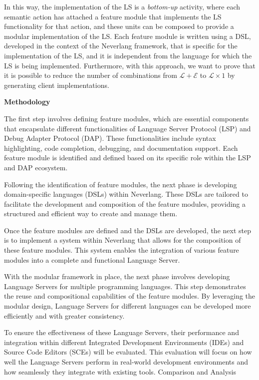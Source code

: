 In this way, the implementation of the LS is a \textit{bottom-up} activity, where each semantic action has attached a feature module that implements the LS functionality for that action, and these units can be composed to provide a modular implementation of the LS.
Each feature module is written using a DSL, developed in the context of the Neverlang framework, that is specific for the implementation of the LS, and it is independent from the language for which the LS is being implemented.
Furthermore, with this approach, we want to prove that it is possible to reduce the number of combinations from $\mathcal{L} + \mathcal{E}$ to $\mathcal{L} \times 1$ by generating client implementations.

\hfill \break
\noindent
\textbf{Methodology}

The first step involves defining feature modules, which are essential components that encapsulate different functionalities of Language Server Protocol (LSP) and Debug Adapter Protocol (DAP). These functionalities include syntax highlighting, code completion, debugging, and documentation support. Each feature module is identified and defined based on its specific role within the LSP and DAP ecosystem.

Following the identification of feature modules, the next phase is developing domain-specific languages (DSLs) within Neverlang. These DSLs are tailored to facilitate the development and composition of the feature modules, providing a structured and efficient way to create and manage them.

Once the feature modules are defined and the DSLs are developed, the next step is to implement a system within Neverlang that allows for the composition of these feature modules. This system enables the integration of various feature modules into a complete and functional Language Server.

With the modular framework in place, the next phase involves developing Language Servers for multiple programming languages. This step demonstrates the reuse and compositional capabilities of the feature modules. By leveraging the modular design, Language Servers for different languages can be developed more efficiently and with greater consistency.

To ensure the effectiveness of these Language Servers, their performance and integration within different Integrated Development Environments (IDEs) and Source Code Editors (SCEs) will be evaluated. This evaluation will focus on how well the Language Servers perform in real-world development environments and how seamlessly they integrate with existing tools.
Comparison and Analysis

